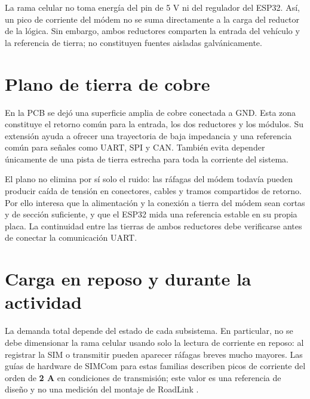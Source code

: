 \documentclass[11pt,letterpaper]{article}
\begin{document}
La rama celular no toma energía del pin de 5 V ni del regulador del ESP32. Así,
un pico de corriente del módem no se suma directamente a la carga del reductor
de la lógica. Sin embargo, ambos reductores comparten la entrada del vehículo y
la referencia de tierra; no constituyen fuentes aisladas galvánicamente.

\section{Plano de tierra de cobre}

En la PCB se dejó una superficie amplia de cobre conectada a GND. Esta zona
constituye el retorno común para la entrada, los dos reductores y los módulos.
Su extensión ayuda a ofrecer una trayectoria de baja impedancia y una referencia
común para señales como UART, SPI y CAN. También evita depender únicamente de
una pista de tierra estrecha para toda la corriente del sistema.

El plano no elimina por sí solo el ruido: las ráfagas del módem todavía pueden
producir caída de tensión en conectores, cables y tramos compartidos de retorno.
Por ello interesa que la alimentación y la conexión a tierra del módem sean
cortas y de sección suficiente, y que el ESP32 mida una referencia estable en
su propia placa. La continuidad entre las tierras de ambos reductores debe
verificarse antes de conectar la comunicación UART.

\section{Carga en reposo y durante la actividad}

La demanda total depende del estado de cada subsistema. En particular, no se
debe dimensionar la rama celular usando solo la lectura de corriente en reposo:
al registrar la SIM o transmitir pueden aparecer ráfagas breves mucho mayores.
Las guías de hardware de SIMCom para estas familias describen picos de corriente
del orden de \textbf{2 A} en condiciones de transmisión; este valor es una
referencia de diseño y no una medición del montaje de RoadLink
\cite{sim800l,a7670}.
\end{document}
